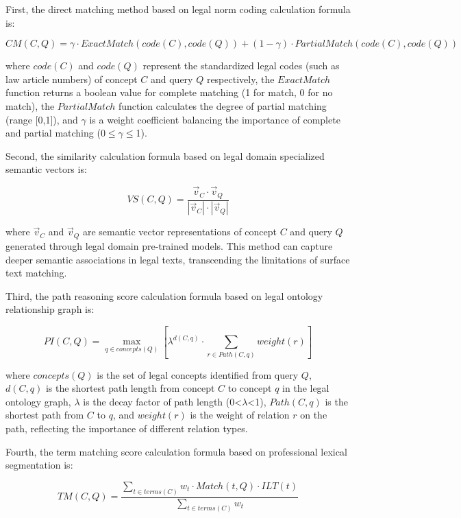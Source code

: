 \documentclass{article}
\theoremstyle{plain}
\theoremstyle{definition}
\begin{document}
First, the direct matching method based on legal norm coding calculation formula is:

\begin{equation}
CM(C, Q) = \gamma \cdot ExactMatch(code(C), code(Q)) + (1-\gamma) \cdot PartialMatch(code(C), code(Q))
\end{equation}

where $code(C)$ and $code(Q)$ represent the standardized legal codes (such as law article numbers) of concept $C$ and query $Q$ respectively, the $ExactMatch$ function returns a boolean value for complete matching (1 for match, 0 for no match), the $PartialMatch$ function calculates the degree of partial matching (range [0,1]), and $\gamma$ is a weight coefficient balancing the importance of complete and partial matching (0$\leq$$\gamma$$\leq$1).

Second, the similarity calculation formula based on legal domain specialized semantic vectors is:

\begin{equation}
VS(C, Q) = \frac{\vec{v}_C \cdot \vec{v}_Q}{|\vec{v}_C| \cdot |\vec{v}_Q|}
\end{equation}

where $\vec{v}_C$ and $\vec{v}_Q$ are semantic vector representations of concept $C$ and query $Q$ generated through legal domain pre-trained models. This method can capture deeper semantic associations in legal texts, transcending the limitations of surface text matching.

Third, the path reasoning score calculation formula based on legal ontology relationship graph is:

\begin{equation}
PI(C, Q) = \max_{q \in concepts(Q)} \left[ \lambda^{d(C,q)} \cdot \sum_{r \in Path(C,q)} weight(r) \right]
\end{equation}

where $concepts(Q)$ is the set of legal concepts identified from query $Q$, $d(C,q)$ is the shortest path length from concept $C$ to concept $q$ in the legal ontology graph, $\lambda$ is the decay factor of path length (0<$\lambda$<1), $Path(C,q)$ is the shortest path from $C$ to $q$, and $weight(r)$ is the weight of relation $r$ on the path, reflecting the importance of different relation types.

Fourth, the term matching score calculation formula based on professional lexical segmentation is:

\begin{equation}
TM(C, Q) = \frac{\sum_{t \in terms(C)} w_t \cdot Match(t, Q) \cdot ILT(t)}{\sum_{t \in terms(C)} w_t}
\end{equation}
\end{document}
